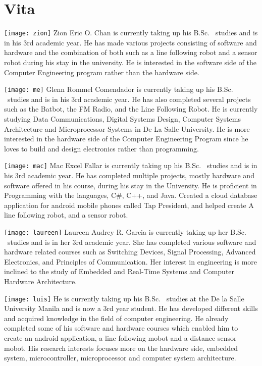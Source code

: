 \chapter{Vita}


{
\vfill
\texttt{[image: zion]}
Zion Eric O. Chan is currently taking up his B.Sc. \degree \ studies and is in his 3rd academic year. He has made various projects consisting of software and hardware and the combination of both such as a line following robot and a sensor robot during his stay in the university. He is interested in the software side of the Computer Engineering program rather than the hardware side.\vspace{5mm}

\texttt{[image: me]}
Glenn Rommel Comendador is currently taking up his B.Sc. \degree \ studies and is in his 3rd academic year. He has also completed several projects such as the Batbot, the FM Radio, and the Line Following Robot. He is currently studying Data Communications, Digital Systems Design, Computer Systems Architecture and Microprocessor Systems in De La Salle University. He is more interested in the hardware side of the Computer Engineering Program since he loves to build and design electronics rather than programming.\vspace{5mm}

\texttt{[image: mac]}
Mac Excel Fallar is currently taking up his B.Sc. \degree \ studies and is in his 3rd academic year. He has completed multiple projects, mostly hardware and software offered in his course, during his stay in the University. He is proficient in Programming with the languages, C\#, C++, and Java. Created a cloud database application for android mobile phones called Tap President, and helped create A line following robot, and a sensor robot.\vspace{5mm} 

\texttt{[image: laureen]}
Laureen Audrey R. Garcia is currently taking up her B.Sc. \degree \ studies and is in her 3rd academic year. She has completed various software and hardware related courses such as Switching Devices, Signal Processing, Advanced Electronics, and Principles of Communication. Her interest in engineering is more inclined to the study of Embedded and Real-Time Systems and Computer Hardware Architecture.\vspace{5mm}

\texttt{[image: luis]}
He is currently taking up his B.Sc. \degree \ studies at the De la Salle University Manila and is now a 3rd year student. He has developed different skills and acquired knowledge in the field of computer engineering. He already completed some of his software and hardware courses which enabled him to create an android application, a line following mobot and a distance sensor mobot. His research interests focuses more on the hardware side, embedded system, microcontroller, microprocessor and computer system architecture.
\vfill
}
